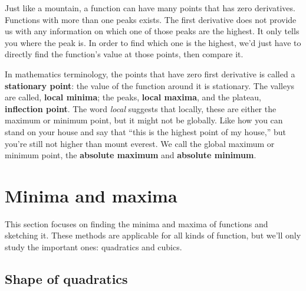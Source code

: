 Just like a mountain, a function can have many points that has zero derivatives. Functions with more than one peaks exists. The first derivative does not provide us with any information on which one of those peaks are the highest. It only tells you where the peak is. In order to find which one is the highest, we'd just have to directly find the function's value at those points, then compare it.

In mathematics terminology, the points that have zero first derivative is called a \textbf{stationary point}: the value of the function around it is stationary. The valleys are called, \textbf{local minima}; the peaks, \textbf{local maxima}, and the plateau, \textbf{inflection point}. The word \emph{local} suggests that locally, these are either the maximum or minimum point, but it might not be globally. Like how you can stand on your house and say that \enquote{this is the highest point of my house,} but you're still not higher than mount everest. We call the global maximum or minimum point, the \textbf{absolute maximum} and \textbf{absolute minimum}. 

\section{Minima and maxima}

This section focuses on finding the minima and maxima of functions and sketching it. These methods are applicable for all kinds of function, but we'll only study the important ones: quadratics and cubics.

\subsection{Shape of quadratics}

